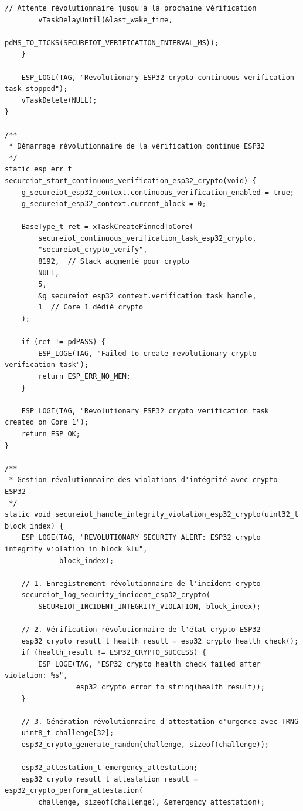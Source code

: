 \begin{lstlisting}[caption={Implémentation révolutionnaire complète du module de vérification d'intégrité ESP32 crypto intégré}]
        // Attente révolutionnaire jusqu'à la prochaine vérification
        vTaskDelayUntil(&last_wake_time, 
                        pdMS_TO_TICKS(SECUREIOT_VERIFICATION_INTERVAL_MS));
    }
    
    ESP_LOGI(TAG, "Revolutionary ESP32 crypto continuous verification task stopped");
    vTaskDelete(NULL);
}

/**
 * Démarrage révolutionnaire de la vérification continue ESP32
 */
static esp_err_t secureiot_start_continuous_verification_esp32_crypto(void) {
    g_secureiot_esp32_context.continuous_verification_enabled = true;
    g_secureiot_esp32_context.current_block = 0;
    
    BaseType_t ret = xTaskCreatePinnedToCore(
        secureiot_continuous_verification_task_esp32_crypto,
        "secureiot_crypto_verify",
        8192,  // Stack augmenté pour crypto
        NULL,
        5,
        &g_secureiot_esp32_context.verification_task_handle,
        1  // Core 1 dédié crypto
    );
    
    if (ret != pdPASS) {
        ESP_LOGE(TAG, "Failed to create revolutionary crypto verification task");
        return ESP_ERR_NO_MEM;
    }
    
    ESP_LOGI(TAG, "Revolutionary ESP32 crypto verification task created on Core 1");
    return ESP_OK;
}

/**
 * Gestion révolutionnaire des violations d'intégrité avec crypto ESP32
 */
static void secureiot_handle_integrity_violation_esp32_crypto(uint32_t block_index) {
    ESP_LOGE(TAG, "REVOLUTIONARY SECURITY ALERT: ESP32 crypto integrity violation in block %lu", 
             block_index);
    
    // 1. Enregistrement révolutionnaire de l'incident crypto
    secureiot_log_security_incident_esp32_crypto(
        SECUREIOT_INCIDENT_INTEGRITY_VIOLATION, block_index);
    
    // 2. Vérification révolutionnaire de l'état crypto ESP32
    esp32_crypto_result_t health_result = esp32_crypto_health_check();
    if (health_result != ESP32_CRYPTO_SUCCESS) {
        ESP_LOGE(TAG, "ESP32 crypto health check failed after violation: %s", 
                 esp32_crypto_error_to_string(health_result));
    }
    
    // 3. Génération révolutionnaire d'attestation d'urgence avec TRNG
    uint8_t challenge[32];
    esp32_crypto_generate_random(challenge, sizeof(challenge));
    
    esp32_attestation_t emergency_attestation;
    esp32_crypto_result_t attestation_result = esp32_crypto_perform_attestation(
        challenge, sizeof(challenge), &emergency_attestation);
    

\end{lstlisting}
